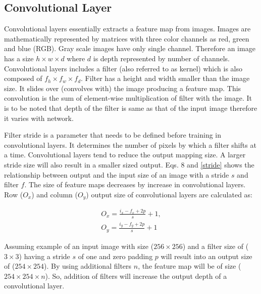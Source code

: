 \documentclass[11pt]{article}
\begin{document}
\subsection{Convolutional Layer}
Convolutional layers essentially extracts a feature map from images. Images are mathematically represented by matrices with three color channels as red, green and blue (RGB). Gray scale images have only single channel. Therefore an image has a size $h \times w \times d$ where $d$ is depth represented by number of channels. Convolutional layers includes a filter (also referred to as kernel) which is also composed of $f_h \times f_w \times f_d$. Filter has a height and width smaller than the image size. It slides over (convolves with) the image producing a feature map. This convolution is the sum of element-wise multiplication of filter with the image. It is to be noted that depth of the filter is same as that of the input image therefore it varies with network.

Filter stride is a parameter that needs to be defined before training in convolutional layers. It determines the number of pixels by which a filter shifts at a time. Convolutional layers tend to reduce the output mapping size. A larger stride size will also result in a smaller sized output. Eqs. 8 and \ref{stride} shows the relationship between output and the input size of an image with a stride $s$ and filter $f$. The size of feature maps decreases by increase in convolutional layers. Row ($O_x$) and column ($O_y$) output size of convolutional layers are calculated as:

\begin{align}
O_{x}=\frac{i_{x}-f_{x} + 2p}{s}+1, \\
O_{y}=\frac{i_{y}-f_{y} + 2p}{s}+1
\label{stride}
\end{align} 

Assuming example of an input image with size ($256 \times 256$) and a filter size of ($3 \times 3$) having a stride $s$ of one and zero padding $p$ will result into an output size of ($254 \times 254$). By using additional filters $n$, the feature map will be of size ($254 \times 254 \times n$). So, addition of filters will increase the output depth of a convolutional layer.

\end{document}
